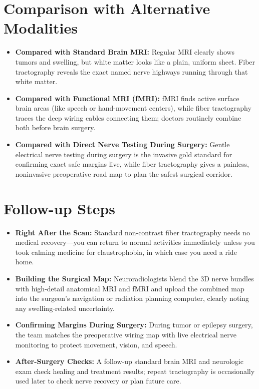 \section{Comparison with Alternative Modalities}

\begin{itemize}
    \item \textbf{Compared with Standard Brain MRI:} Regular MRI clearly shows tumors and swelling, but white matter looks like a plain, uniform sheet. Fiber tractography reveals the exact named nerve highways running through that white matter.
    \item \textbf{Compared with Functional MRI (fMRI):} fMRI finds active surface brain areas (like speech or hand-movement centers), while fiber tractography traces the deep wiring cables connecting them; doctors routinely combine both before brain surgery.
    \item \textbf{Compared with Direct Nerve Testing During Surgery:} Gentle electrical nerve testing during surgery is the invasive gold standard for confirming exact safe margins live, while fiber tractography gives a painless, noninvasive preoperative road map to plan the safest surgical corridor.
\end{itemize}

\section{Follow-up Steps}

\begin{itemize}
    \item \textbf{Right After the Scan:} Standard non-contrast fiber tractography needs no medical recovery---you can return to normal activities immediately unless you took calming medicine for claustrophobia, in which case you need a ride home.
    \item \textbf{Building the Surgical Map:} Neuroradiologists blend the 3D nerve bundles with high-detail anatomical MRI and fMRI and upload the combined map into the surgeon's navigation or radiation planning computer, clearly noting any swelling-related uncertainty.
    \item \textbf{Confirming Margins During Surgery:} During tumor or epilepsy surgery, the team matches the preoperative wiring map with live electrical nerve monitoring to protect movement, vision, and speech.
    \item \textbf{After-Surgery Checks:} A follow-up standard brain MRI and neurologic exam check healing and treatment results; repeat tractography is occasionally used later to check nerve recovery or plan future care.
\end{itemize}


